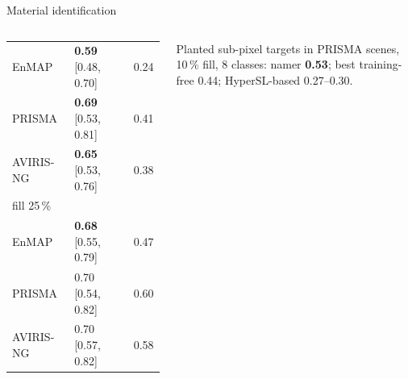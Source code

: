 \documentclass[aspectratio=169,10pt]{beamer}
\newcommand{\tx}[1]{{\fontsize{6.6}{7.9}\selectfont #1\par}}
\begin{document}
\begin{frame}{Material identification}
\begin{columns}[T,onlytextwidth]
{\begin{tabular}{@{}lll@{}}
\midrule
EnMAP & \textbf{0.59} [0.48, 0.70] & 0.24\\
PRISMA & \textbf{0.69} [0.53, 0.81] & 0.41\\
AVIRIS-NG & \textbf{0.65} [0.53, 0.76] & 0.38\\
\midrule
fill 25\,\% & & \\
EnMAP & \textbf{0.68} [0.55, 0.79] & 0.47\\
PRISMA & 0.70 [0.54, 0.82] & 0.60\\
AVIRIS-NG & 0.70 [0.57, 0.82] & 0.58\\
\bottomrule
\end{tabular}}\par
\vspace{0.6mm}
\tx{Planted sub-pixel targets in PRISMA scenes, 10\,\% fill, 8 classes: namer \textbf{0.53}; best training-free 0.44; HyperSL-based 0.27--0.30.}
\end{columns}
\end{frame}
\end{document}
